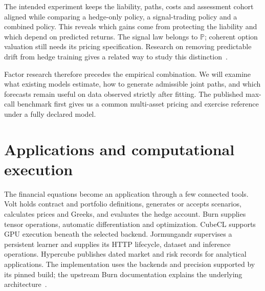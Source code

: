 \documentclass[8pt]{strategynet-journal}
\newcommand{\PP}{\mathbb{P}}
\begin{document}
\begin{SNcolumns}
The intended experiment keeps the liability, paths, costs and assessment
cohort aligned while comparing a hedge-only policy, a signal-trading policy
and a combined policy. This reveals which gains come from protecting the
liability and which depend on predicted returns. The signal law belongs to
$\PP$; coherent option valuation still needs its pricing specification.
Research on removing predictable drift from hedge training gives a related
way to study this distinction~\cite{drift}.

Factor research therefore precedes the empirical combination. We will examine
what existing models estimate, how to generate admissible joint paths, and
which forecasts remain useful on data observed strictly after fitting. The
published max-call benchmark first gives us a common multi-asset pricing and
exercise reference under a fully declared model.

\section{Applications and computational execution}
The financial equations become an application through a few connected tools.
Volt holds contract and portfolio definitions, generates or accepts scenarios,
calculates prices and Greeks, and evaluates the hedge account. Burn supplies
tensor operations, automatic differentiation and optimization. CubeCL supports
GPU execution beneath the selected backend. Jormungandr supervises a persistent
learner and supplies its HTTP lifecycle, dataset and inference operations.
Hypercube publishes dated market and risk records for analytical applications.
The implementation uses the backends and precision supported by its pinned
build; the upstream Burn documentation explains the underlying
architecture~\cite{burn}.


\end{SNcolumns}
\end{document}
